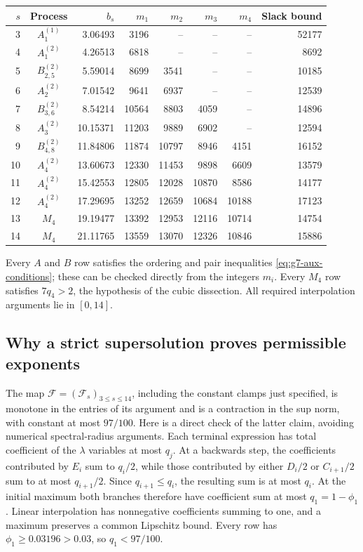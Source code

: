 \documentclass[11pt,reqno]{amsart}
\numberwithin{equation}{section}
\theoremstyle{definition}
\begin{document}
\begin{center}
\small
\begin{tabular}{r c r r r r r r}
\hline
$s$ & Process & $b_s$ & $m_1$ & $m_2$ & $m_3$ & $m_4$ & Slack bound\\
\hline
3 & $A_{1}^{(1)}$ & 3.06493 & 3196 & -- & -- & -- & 52177 \\
4 & $A_{1}^{(2)}$ & 4.26513 & 6818 & -- & -- & -- & 8692 \\
5 & $B_{2,5}^{(2)}$ & 5.59014 & 8699 & 3541 & -- & -- & 10185 \\
6 & $A_{2}^{(2)}$ & 7.01542 & 9641 & 6937 & -- & -- & 12539 \\
7 & $B_{3,6}^{(2)}$ & 8.54214 & 10564 & 8803 & 4059 & -- & 14896 \\
8 & $A_{3}^{(2)}$ & 10.15371 & 11203 & 9889 & 6902 & -- & 12594 \\
9 & $B_{4,8}^{(2)}$ & 11.84806 & 11874 & 10797 & 8946 & 4151 & 16152 \\
10 & $A_{4}^{(2)}$ & 13.60673 & 12330 & 11453 & 9898 & 6609 & 13579 \\
11 & $A_{4}^{(2)}$ & 15.42553 & 12805 & 12028 & 10870 & 8586 & 14177 \\
12 & $A_{4}^{(2)}$ & 17.29695 & 13252 & 12659 & 10684 & 10188 & 17123 \\
13 & $M_4$ & 19.19477 & 13392 & 12953 & 12116 & 10714 & 14754 \\
14 & $M_4$ & 21.11765 & 13559 & 13070 & 12326 & 10846 & 15886 \\
\hline
\end{tabular}
\end{center}

Every $A$ and $B$ row satisfies the ordering and pair inequalities
\eqref{eq:g7-aux-conditions}; these can be checked directly from the integers
$m_i$.  Every $M_4$ row satisfies $7q_4>2$, the hypothesis of the cubic
dissection.  All required interpolation arguments lie in $[0,14]$.

\subsection{Why a strict supersolution proves permissible exponents}

The map $\mathcal F=(\mathcal F_s)_{3\le s\le14}$, including the
constant clamps just specified, is monotone in the entries
of its argument and is a contraction in the sup norm, with constant at most
$97/100$.  Here is a direct check of the latter claim, avoiding numerical
spectral-radius arguments.  Each terminal expression has total coefficient
of the $\lambda$ variables at most $q_j$.  At a backwards step, the
coefficients contributed by $E_i$ sum to $q_i/2$, while those contributed by
either $D_i/2$ or $C_{i+1}/2$ sum to at most $q_{i+1}/2$.
Since $q_{i+1}\le q_i$, the resulting sum is at most $q_i$.
At the initial maximum both branches therefore have coefficient sum at most
$q_1=1-\phi_1$.  Linear interpolation has nonnegative coefficients summing
to one, and a maximum preserves a common Lipschitz bound.
Every row has $\phi_1\ge0.03196>0.03$, so $q_1<97/100$.
\end{document}
